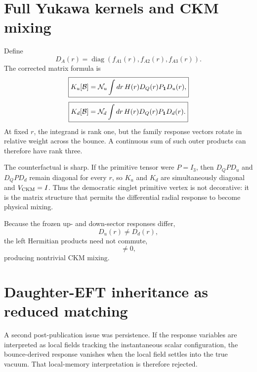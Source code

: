 \documentclass[11pt]{article}
\begin{document}
\section{Full Yukawa kernels and CKM mixing}
Define
\begin{equation}
D_A(r)=\operatorname{diag}(f_{A1}(r),f_{A2}(r),f_{A3}(r)).
\end{equation}
The corrected matrix formula is
\begin{equation}
\boxed{K_u[\mathcal B]={\cal N}_u\int dr\,H(r)D_Q(r)P_{\bf1}D_u(r),}
\end{equation}
\begin{equation}
\boxed{K_d[\mathcal B]={\cal N}_d\int dr\,H(r)D_Q(r)P_{\bf1}D_d(r).}
\end{equation}
At fixed $r$, the integrand is rank one, but the family response vectors rotate in relative weight across the bounce. A continuous sum of such outer products can therefore have rank three.

The counterfactual is sharp. If the primitive tensor were $P=I_3$, then $D_QPD_u$ and $D_QPD_d$ remain diagonal for every $r$, so $K_u$ and $K_d$ are simultaneously diagonal and $V_{\rm CKM}=I$. Thus the democratic singlet primitive vertex is not decorative: it is the matrix structure that permits the differential radial response to become physical mixing.

Because the frozen up- and down-sector responses differ,
\begin{equation}
D_u(r)\neq D_d(r),
\end{equation}
the left Hermitian products need not commute,
\begin{equation}
[K_uK_u^\dagger,K_dK_d^\dagger]\neq0,
\end{equation}
producing nontrivial CKM mixing.

\section{Daughter-EFT inheritance as reduced matching}
A second post-publication issue was persistence. If the response variables are interpreted as local fields tracking the instantaneous scalar configuration, the bounce-derived response vanishes when the local field settles into the true vacuum. That local-memory interpretation is therefore rejected.
\end{document}

